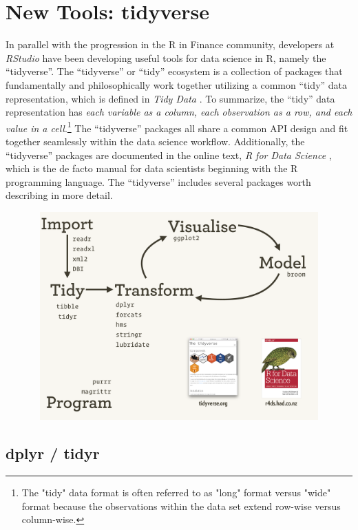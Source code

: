 \section{New Tools: tidyverse}\label{new-tools-tidyverse}

In parallel with the progression in the R in Finance community,
developers at \emph{RStudio} have been developing useful tools for data
science in R, namely the ``tidyverse''. The ``tidyverse'' or ``tidy''
ecosystem is a collection of packages that fundamentally and
philosophically work together utilizing a common ``tidy'' data
representation, which is defined in \emph{Tidy Data} \citep{tidy-data}.
To summarize, the ``tidy'' data representation has \emph{each variable
as a column, each observation as a row, and each value in a
cell}.\footnote{The "tidy" data format is often referred to as "long" format versus "wide" format because the observations within the data set extend row-wise versus column-wise. }
The ``tidyverse'' packages all share a common API design and fit
together seamlessly within the data science workflow. Additionally, the
``tidyverse'' packages are documented in the online text, \emph{R for
Data Science} \citep{R4DS2017}, which is the de facto manual for data
scientists beginning with the R programming language. The ``tidyverse''
includes several packages worth describing in more detail.

\begin{figure}[htbp]
  \centering
  \includegraphics[width=12cm, height=8cm]{img/tidyverse}
  \tidyverse
\end{figure}

\subsection{dplyr / tidyr}\label{dplyr-tidyr}


